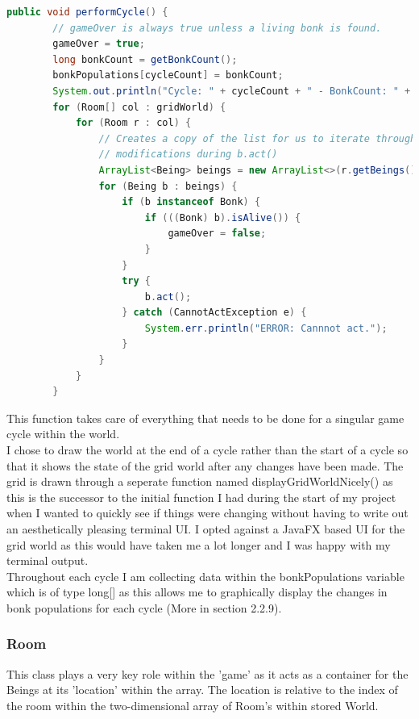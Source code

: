 \documentclass[12pt]{article}
\begin{document}
\begin{lstlisting}[language=Java, basicstyle=\tiny, caption=performCycle function]
    public void performCycle() {
        // gameOver is always true unless a living bonk is found.
        gameOver = true;
        long bonkCount = getBonkCount();
        bonkPopulations[cycleCount] = bonkCount;
        System.out.println("Cycle: " + cycleCount + " - BonkCount: " + bonkCount);
        for (Room[] col : gridWorld) {
            for (Room r : col) {
                // Creates a copy of the list for us to iterate through despite
                // modifications during b.act()
                ArrayList<Being> beings = new ArrayList<>(r.getBeings());
                for (Being b : beings) {
                    if (b instanceof Bonk) {
                        if (((Bonk) b).isAlive()) {
                            gameOver = false;
                        }
                    }
                    try {
                        b.act();
                    } catch (CannotActException e) {
                        System.err.println("ERROR: Cannnot act.");
                    }
                }
            }
        }
\end{lstlisting}

This function takes care of everything that needs to be done for a singular game cycle within the world. \\

I chose to draw the world at the end of a cycle rather than the start of a cycle so that it shows the state of the grid world after any changes have been made. The grid is drawn through a seperate function named displayGridWorldNicely() as this is the successor to the initial function I had during the start of my project when I wanted to quickly see if things were changing without having to write out an aesthetically pleasing terminal UI. I opted against a JavaFX based UI for the grid world as this would have taken me a lot longer and I was happy with my terminal output.\\

Throughout each cycle I am collecting data within the bonkPopulations variable which is of type long[] as this allows me to graphically display the changes in bonk populations for each cycle (More in section 2.2.9).

\subsubsection{Room}
This class plays a very key role within the 'game' as it acts as a container for the Beings at its 'location' within the array. The location is relative to the index of the room within the two-dimensional array of Room's within stored World.\\
\end{document}
